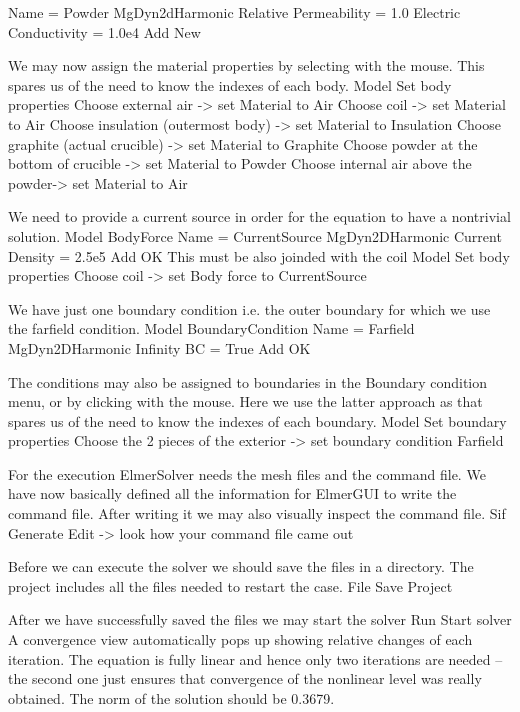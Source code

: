     Name = Powder
    MgDyn2dHarmonic
      Relative Permeability = 1.0
      Electric Conductivity = 1.0e4
    Add
    New
\ttend

We may now assign the material properties by selecting with the mouse.
This spares us of the 
need to know the indexes of each body.
\ttbegin
Model
  Set body properties
    Choose external air -> set Material to Air
    Choose coil -> set Material to Air
    Choose insulation (outermost body) -> set Material to Insulation
    Choose graphite (actual crucible) -> set Material to Graphite
    Choose powder at the bottom of crucible -> set Material to Powder
    Choose internal air above the powder-> set Material to Air
\ttend

We need to provide a current source in order for the equation to have a nontrivial solution.
\ttbegin
Model
  BodyForce
    Name = CurrentSource
    MgDyn2DHarmonic
      Current Density = 2.5e5
    Add
    OK
\ttend   
This must be also joinded with the coil
\ttbegin
Model
  Set body properties
    Choose coil -> set Body force to CurrentSource
\ttend


We have just one boundary condition i.e. the outer boundary for which we use the farfield condition.
\ttbegin
Model
  BoundaryCondition
    Name = Farfield
    MgDyn2DHarmonic
      Infinity BC = True
    Add
    OK
\ttend   

The conditions may also be assigned to boundaries in the Boundary condition menu, or 
by clicking with the mouse. Here we use the latter approach as that spares us of the 
need to know the indexes of each boundary.
\ttbegin
Model
  Set boundary properties
    Choose the 2 pieces of the exterior -> set boundary condition Farfield
\ttend

For the execution 
ElmerSolver needs the mesh files and the command file. We have now basically defined
all the information for ElmerGUI to write the command file. After writing it we may also visually 
inspect the command file.
\ttbegin
Sif 
  Generate
  Edit -> look how your command file came out  
\ttend

Before we can execute the solver we should save the files in a directory. The project includes
all the files needed to restart the case.
\ttbegin
File 
  Save Project
\ttend

After we have successfully saved the files we may start the solver
\ttbegin
Run
  Start solver
\ttend
A convergence view automatically pops up showing relative changes of each iteration.
The equation is fully linear and hence only two iterations are needed -- the second 
one just ensures that convergence of the nonlinear level was really obtained. 
The norm of the solution should be 0.3679.



